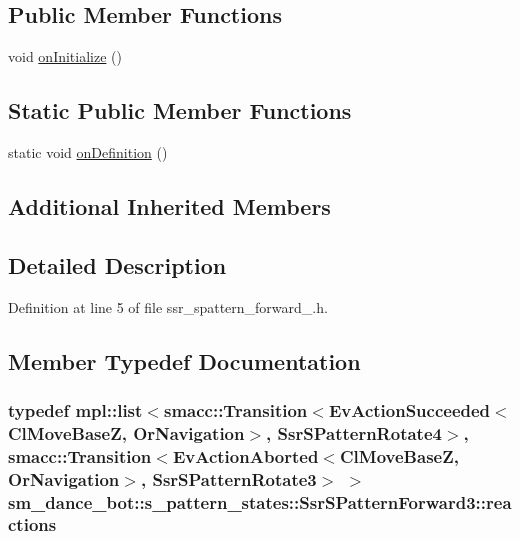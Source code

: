 \subsection*{Public Member Functions}
\begin{DoxyCompactItemize}
\item 
void \hyperlink{structsm__dance__bot_1_1s__pattern__states_1_1SsrSPatternForward3_acbb920519a5ec18ac21a7d5e920c77b6}{on\+Initialize} ()
\end{DoxyCompactItemize}
\subsection*{Static Public Member Functions}
\begin{DoxyCompactItemize}
\item 
static void \hyperlink{structsm__dance__bot_1_1s__pattern__states_1_1SsrSPatternForward3_a9a3f903888fed5a3cd2f4a6f46525343}{on\+Definition} ()
\end{DoxyCompactItemize}
\subsection*{Additional Inherited Members}


\subsection{Detailed Description}


Definition at line 5 of file ssr\+\_\+spattern\+\_\+forward\+\_.\+h.



\subsection{Member Typedef Documentation}
\subsubsection[{\texorpdfstring{reactions}{reactions}}]{\setlength{\rightskip}{0pt plus 5cm}typedef mpl\+::list$<${\bf smacc\+::\+Transition}$<$Ev\+Action\+Succeeded$<${\bf Cl\+Move\+BaseZ}, {\bf Or\+Navigation}$>$, {\bf Ssr\+S\+Pattern\+Rotate4}$>$, {\bf smacc\+::\+Transition}$<$Ev\+Action\+Aborted$<${\bf Cl\+Move\+BaseZ}, {\bf Or\+Navigation}$>$, {\bf Ssr\+S\+Pattern\+Rotate3}$>$ $>$ {\bf sm\+\_\+dance\+\_\+bot\+::s\+\_\+pattern\+\_\+states\+::\+Ssr\+S\+Pattern\+Forward3\+::reactions}}\hypertarget{structsm__dance__bot_1_1s__pattern__states_1_1SsrSPatternForward3_a735f6e220440d80f0e4d488f19654b40}{}\label{structsm__dance__bot_1_1s__pattern__states_1_1SsrSPatternForward3_a735f6e220440d80f0e4d488f19654b40}


